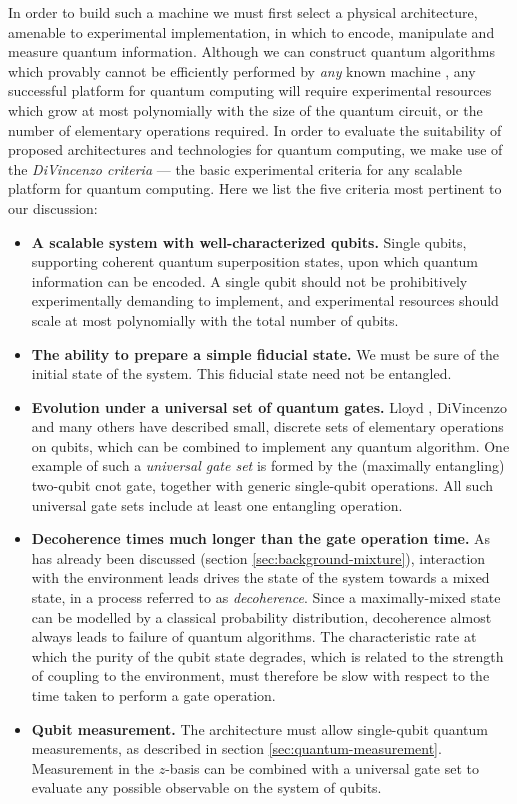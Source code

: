 In order to build such a machine we must first select a physical architecture, amenable to experimental implementation, in which to encode, manipulate and measure quantum information. 
Although we can construct quantum algorithms which provably cannot be efficiently performed by \emph{any} known machine \cite{Nielsen2004}, any successful platform for quantum computing will require experimental resources which grow at most polynomially with the size of the quantum circuit, or the number of elementary operations required. In order to evaluate the suitability of proposed architectures and technologies for quantum computing, we make use of the \emph{DiVincenzo criteria} \cite{DiVincenzo2000} --- the basic experimental criteria for any scalable platform for quantum computing. Here we list the five criteria most pertinent to our discussion:
\begin{itemize}
    \item \textbf{A scalable system with well-characterized qubits.} Single qubits, supporting coherent quantum superposition states, upon which quantum information can be encoded. A single qubit should not be prohibitively experimentally demanding to implement, and experimental resources should scale at most polynomially with the total number of qubits.
    \item \textbf{The ability to prepare a simple fiducial state.} We must be sure of the initial state of the system. This fiducial state need not be entangled.
    \item \textbf{Evolution under a universal set of quantum gates.} Lloyd \cite{Lloyd1995a}, DiVincenzo \cite{DiVincenzo1995} and many others have described small, discrete sets of elementary operations on qubits, which can be combined to implement any quantum algorithm. One example of such a \emph{universal gate set} is formed by the (maximally entangling) two-qubit \gls{cnot} gate, together with generic single-qubit operations. All such universal gate sets include at least one entangling operation.
    \item \textbf{Decoherence times much longer than the gate operation time.}
        As has already been discussed (section \ref{sec:background-mixture}), interaction with the environment leads drives the state of the system towards a mixed state, in a process referred to as \emph{decoherence}. Since a maximally-mixed state can be modelled by a classical probability distribution, decoherence almost always leads to failure of quantum algorithms. The characteristic rate at which the purity of the qubit state degrades, which is related to the strength of coupling to the environment, must therefore be slow with respect to the time taken to perform a gate operation.
    \item \textbf{Qubit measurement.} The architecture must allow single-qubit quantum measurements, as described in section \ref{sec:quantum-measurement}. Measurement in the $z$-basis can be combined with a universal gate set to evaluate any possible observable on the system of qubits.
\end{itemize}

